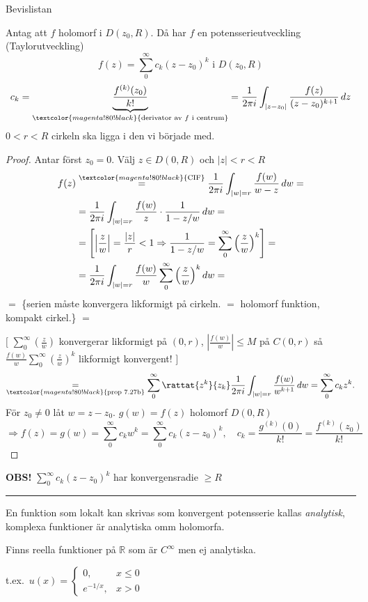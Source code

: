 \begin{theorem}
\hfill \textcolor{magenta!80!black}{Bevislistan}

Antag att $f$ holomorf i $D(z_0, R)$. Då har $f$ en potensserieutveckling (Taylorutveckling)
\[ f(z) = \sum_0^\infty c_k(z - z_0)^k \text{ i } D(z_0, R) \]
\[ c_k = \underbrace{\frac{f^{(k)}(z_0)}{k!}}_{\textcolor{magenta!80!black}{\text{derivator av } f \text{ i centrum}}} = \frac{1}{2\pi i} \int_{|z - z_0|} \frac{f(z)}{(z - z_0)^{k+1}}\,dz \]
$0 < r < R$ \quad \textcolor{magenta!80!black}{cirkeln ska ligga i den vi började med.}
\end{theorem}
\begin{proof}
Antar först \emph{$z_0 = 0$}. Välj $z \in D(0, R)$ och $|z| < r < R$
\begin{align*}
  f(z) &\overset{\textcolor{magenta!80!black}{\text{CIF}}}{=} \frac{1}{2\pi i} \int_{|w| = r} \frac{f(w)}{w - z}\,dw = \\
  &= \frac{1}{2\pi i} \int_{|w| = r} \frac{f(w)}{z} \cdot \frac{1}{1 - z/w}\,dw = \\
  &= \left[ \left| \frac{z}{w} \right| = \frac{|z|}{r} < 1 \Rightarrow \frac{1}{1 - z/w} = \sum_0^\infty \left( \frac{z}{w} \right)^k \right] = \\
  &= \frac{1}{2\pi i} \int_{|w| = r} \frac{f(w)}{w} \sum_0^\infty \left( \frac{z}{w} \right)^k dw =
\end{align*}
$=$ \textcolor{magenta!80!black}{\{serien måste konvergera likformigt på cirkeln. $=$ holomorf funktion, kompakt cirkel.\}} $=$

\quad $\Big[$ $\sum_0^\infty \left( \frac{z}{w} \right)$ konvergerar likformigt på $(0, r)$, $\left| \frac{f(w)}{w} \right| \le M$ på $C(0, r)$ så $\frac{f(w)}{w} \sum_0^\infty \left( \frac{z}{w} \right)^k$ likformigt konvergent! $\Big]$
\[ \underset{\textcolor{magenta!80!black}{\text{prop 7.27b}}}{=} \sum_0^\infty \rattat{z^k}{z_k} \frac{1}{2\pi i} \int_{|w| = r} \frac{f(w)}{w^{k+1}}\,dw = \sum_0^\infty c_k z^k. \]
För $z_0 \neq 0$ låt $w = z - z_0$. $g(w) = f(z)$ holomorf $D(0, R)$
\[ \Longrightarrow f(z) = g(w) = \sum_0^\infty c_k w^k = \sum_0^\infty c_k(z - z_0)^k, \quad c_k = \frac{g^{(k)}(0)}{k!} = \frac{f^{(k)}(z_0)}{k!} \]
\end{proof}

\textcolor{red!70!black}{\textbf{OBS!}} $\sum_0^\infty c_k(z - z_0)^k$ har konvergensradie $\ge R$

\noindent\rule{\linewidth}{0.4pt}

En funktion som lokalt kan skrivas som konvergent potensserie kallas \emph{analytisk}, komplexa funktioner är analytiska omm holomorfa.

Finns reella funktioner på $\mathbb{R}$ som är $C^\infty$ men ej analytiska.

t.ex.\ $u(x) = \begin{cases} 0, & x \le 0 \\ e^{-1/x}, & x > 0 \end{cases}$
